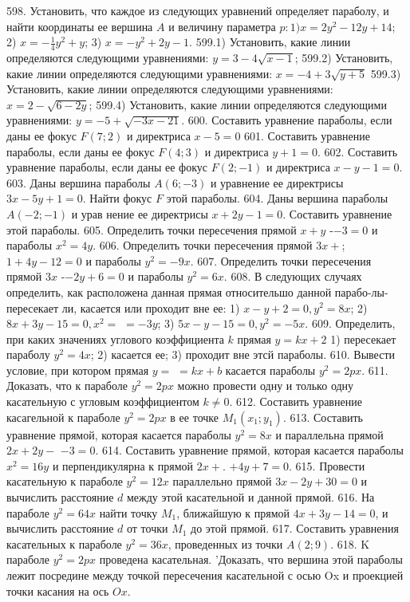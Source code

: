 598. Установить, что каждое из следующих уравнений определяет параболу, и найти координаты ее вершина $A$ и величину параметра $p: 1) x=2 y^2-12 y+14$; 2) $x=-\frac{1}{4} y^2+y$; 3) $x=-y^2+2 y-1$.
599.1) Установить, какие линии определяются следующими уравнениями: $y=3-4 \sqrt{x-1}$;
599.2) Установить, какие линии определяются следующими уравнениями: $x=-4+3 \sqrt{y+5}$
599.3) Установить, какие линии определяются следующими уравнениями: $x=2-\sqrt{6-2 y}$;
599.4) Установить, какие линии определяются следующими уравнениями: $y=-5+\sqrt{-3 x-21}$.
600. Составить уравнение параболы, если даны ее фокус $F(7 ; 2)$ и директриса $x-5=0$
601. Составить уравнение параболы, если даны ее фокус $F(4 ; 3)$ и директриса $y+1=0$.
602. Составить уравнение параболы, если даны ее фокус $F(2 ;-1)$ и директриса $x-y-1=0$.
603. Даны вершина параболы $A(6 ;-3)$ и уравнение ее директрисы $3 x-5 y+1=0$. Найти фокус $F$ этой параболы.
604. Даны вершина параболы $A(-2 ;-1)$ и урав нение ее директрисы $x+2 y-1=0$. Составить уравнение этой параболы.
605. Определить точки пересечения прямой $x+y$ -$-3=0$ и параболы $x^2=4 y$.
606. Определить точки пересечения прямой $3 x+$; $1+4 y-12=0$ и параболы $y^2=-9 x$.
607. Определить точки пересечения прямой $3 x$ -$-2 y+6=0$ и параболы $y^2=6 x$.
608. В следующих случаях определить, как расположена данная прямая относительшо данной парабо-лы-пересекает ли, касается или проходит вне ее: 1) $x-y+2=0, y^2=8 x$; 2) $8 x+3 y-15=0, x^2=$ $=-3 y$; 3) $5 x-y-15=0, y^2=-5 x$.
609. Определить, при каких значениях углового коэффициента $k$ прямая $y=k x+2$ 1) пересекает параболу $y^2=4 x$; 2) касается ее; 3) проходит вне этсй параболы.
610. Вывести условие, при котором прямая $y=$ $=k x+b$ касается параболы $y^2=2 p x$.
611. Доказать, что к параболе $y^2=2 p x$ можно провести одну и только одну касательную с угловым коэффициентом $k \neq 0$.
612. Составить уравнение касагельной к параболе $y^2=2 p x$ в ее точке $M_1\left(x_1 ; y_1\right)$.
613. Составить уравнение прямой, которая касается параболы $y^2=8 x$ и параллельна прямой $2 x+2 y-$ $-3=0$.
614. Составить уравнение прямой, которая касается параболы $x^2=16 y$ и перпендикулярна к прямой $2 x+$. $+4 y+7=0$.
615. Провести касательную к параболе $y^2=12 x$ параллельно прямой $3 x-2 y+30=0$ и вычислить расстояние $d$ между этой касательной и данной прямой.
616. На параболе $y^2=64 x$ найти точку $M_1$, ближайшую к прямой $4 x+3 y-14=0$, и вычислить расстояние $d$ от точки $M_1$ до этой прямой.
617. Составить уравнения касательных к параболе $y^2=36 x$, проведенных из точки $A(2 ; 9)$.
618. K параболе $y^2=2 p x$ проведена касательная. 'Доказать, что вершина этой параболы лежит посредине между точкой пересечения касательной с осью Ox и проекцией точки касания на ось $O x$.
